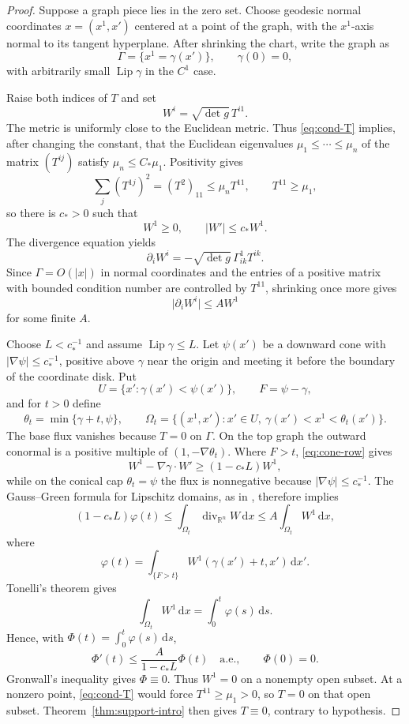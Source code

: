 \documentclass[11pt,reqno]{amsart}
\theoremstyle{definition}
\theoremstyle{remark}
\newcommand{\diver}{\operatorname{div}}
\newcommand{\dd}{\,\mathrm d}
\newcommand{\R}{\mathbb R}
\newcommand{\abs}[1]{\lvert #1\rvert}
\begin{document}
\begin{proof}
Suppose a graph piece lies in the zero set.  Choose geodesic normal coordinates $x=(x^1,x')$ centered at a point of the graph, with the $x^1$-axis normal to its tangent hyperplane.  After shrinking the chart, write the graph as
\[
\Gamma=\{x^1=\gamma(x')\},
\qquad \gamma(0)=0,
\]
with arbitrarily small $\operatorname{Lip}\gamma$ in the $C^1$ case.

Raise both indices of $T$ and set
\[
W^i=\sqrt{\det g}\,T^{i1}.
\]
The metric is uniformly close to the Euclidean metric.  Thus \eqref{eq:cond-T} implies, after changing the constant, that the Euclidean eigenvalues $\mu_1\le\cdots\le\mu_n$ of the matrix $(T^{ij})$ satisfy $\mu_n\le C_*\mu_1$.  Positivity gives
\[
\sum_j(T^{1j})^2=(T^2)_{11}\le\mu_nT^{11},
\qquad T^{11}\ge\mu_1,
\]
so there is $c_*>0$ such that
\begin{equation}\label{eq:cone-row}
W^1\ge0,
\qquad
\abs{W'}\le c_*W^1.
\end{equation}
The divergence equation yields
\[
\partial_iW^i=-\sqrt{\det g}\,\Gamma^1_{ik}T^{ik}.
\]
Since $\Gamma=O(\abs{x})$ in normal coordinates and the entries of a positive matrix with bounded condition number are controlled by $T^{11}$, shrinking once more gives
\begin{equation}\label{eq:divW}
\abs{\partial_iW^i}\le A W^1
\end{equation}
for some finite $A$.

Choose $L<c_*^{-1}$ and assume $\operatorname{Lip}\gamma\le L$.  Let $\psi(x')$ be a downward cone with $\abs{\nabla\psi}\le c_*^{-1}$, positive above $\gamma$ near the origin and meeting it before the boundary of the coordinate disk.  Put
\[
U=\{x':\gamma(x')<\psi(x')\},
\qquad
F=\psi-\gamma,
\]
and for $t>0$ define
\[
\theta_t=\min\{\gamma+t,\psi\},
\qquad
\Omega_t=\{(x^1,x'):x'\in U,\ \gamma(x')<x^1<\theta_t(x')\}.
\]
The base flux vanishes because $T=0$ on $\Gamma$.  On the top graph the outward conormal is a positive multiple of $(1,-\nabla\theta_t)$.  Where $F>t$, \eqref{eq:cone-row} gives
\[
W^1-\nabla\gamma\cdot W'
\ge(1-c_*L)W^1,
\]
while on the conical cap $\theta_t=\psi$ the flux is nonnegative because $\abs{\nabla\psi}\le c_*^{-1}$.  The Gauss--Green formula for Lipschitz domains, as in \cite[Chapter 5]{EvansGariepy}, therefore implies
\[
(1-c_*L)\varphi(t)
\le\int_{\Omega_t}\diver_{\R^n}W\dd x
\le A\int_{\Omega_t}W^1\dd x,
\]
where
\[
\varphi(t)=\int_{\{F>t\}}W^1(\gamma(x')+t,x')\dd x'.
\]
Tonelli's theorem gives
\[
\int_{\Omega_t}W^1\dd x=\int_0^t\varphi(s)\dd s.
\]
Hence, with $\Phi(t)=\int_0^t\varphi(s)\dd s$,
\[
\Phi'(t)\le\frac{A}{1-c_*L}\Phi(t)
\quad\text{a.e.},
\qquad
\Phi(0)=0.
\]
Gronwall's inequality gives $\Phi\equiv0$.  Thus $W^1=0$ on a nonempty open subset.  At a nonzero point, \eqref{eq:cond-T} would force $T^{11}\ge\mu_1>0$, so $T=0$ on that open subset.  Theorem~\ref{thm:support-intro} then gives $T\equiv0$, contrary to hypothesis.
\end{proof}
\end{document}
